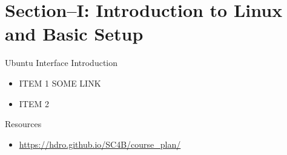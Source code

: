 


\maketitle
\section{Section--I: Introduction to Linux and Basic Setup}
\begin{frame}[t]{Ubuntu Interface Introduction}
    \begin{itemize}
      \item ITEM 1
      SOME LINK
      \item ITEM 2
    \end{itemize}
\end{frame}
\begin{frame}[t]{Resources}
	\begin{itemize}
		\item \url{https://hdro.github.io/SC4B/course_plan/}
	\end{itemize}
\end{frame}



